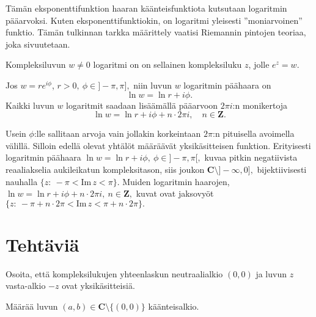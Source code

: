 \documentclass[a4paper, 12pt]{article}
\theoremstyle{remark}
\theoremstyle{definition}
\renewcommand{\Im}[1]{\textrm{Im}\, #1}
\begin{document}
Tämän eksponenttifunktion haaran käänteisfunktiota kutsutaan logaritmin pääarvoksi. Kuten eksponenttifunktiokin, on logaritmi yleisesti  ''moniarvoinen'' funktio. Tämän tulkinnan tarkka määrittely vaatisi Riemannin pintojen teoriaa, joka sivuutetaan.

\begin{maar}
Kompleksiluvun $w\neq 0$ logaritmi on on sellainen kompleksiluku $z$, jolle $e^z=w.$
\end{maar}

\begin{maar} Jos $w=re^{i\phi}$, $r>0,\ \phi\in]-\pi, \pi],$ niin luvun $w$ logaritmin päähaara on
$$
\ln w=\ln r +i\phi.
$$
Kaikki luvun $w$ logaritmit saadaan lisäämällä pääarvoon $2\pi i$:n monikertoja
$$
\ln w=\ln r+i\phi+n\cdot 2\pi i,\quad n\in\mathbf{Z}.
$$
\end{maar}

\begin{huom} Usein $\phi$:lle sallitaan arvoja vain jollakin korkeintaan $2\pi$:n pituisella avoimella välillä. Silloin edellä olevat yhtälöt määräävät yksikäsitteisen funktion. Erityisesti logaritmin päähaara
$\ln w=\ln r+i\phi,\ \phi\in]-\pi, \pi[,$ kuvaa pitkin negatiivista reaaliakselia aukileikatun kompleksitason, siis joukon $\mathbf{C}\setminus]-\infty, 0],$ bijektiivisesti nauhalla $\{z:\ -\pi< \Im z < \pi\}.$ Muiden logaritmin haarojen, $\ln w=\ln r+i\phi +n\cdot 2\pi i,\ n\in\mathbf{Z},$ kuvat ovat jaksovyöt \newline
$\{z:\ -\pi+n\cdot 2\pi<\Im z < \pi+n\cdot 2\pi\}.$
\end{huom}
\clearpage


\clearpage
\section*{Tehtäviä}
\linespread{1.667}
\begin{teht}
Osoita, että kompleksilukujen yhteenlaskun neutraalialkio $(0, 0)$ ja luvun $z$ vasta-alkio $-z$ ovat yksikäsitteisiä.
\end{teht}

\begin{teht}
Määrää luvun $(a, b)\in\mathbf{C}\setminus\{(0,0)\}$ käänteisalkio.
\end{teht}
\end{document}
